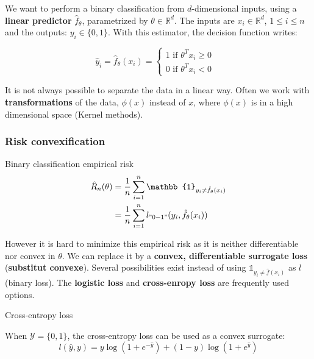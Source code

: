 \documentclass[
10pt, %
a4paper, %
oneside, %
headinclude,footinclude, %
BCOR5mm, %
]{scrartcl}
\begin{document}
We want to perform a binary classification from $d$-dimensional inputs, using a
\textbf{{linear predictor}} $\hat{f}_{\theta}$, parametrized by $\theta\in \mathbb{R}^d$. The inputs are $x_i \in \mathbb{R}^d$, $1\leq i \leq n$ and the outputs: $y_i\in \{0, 1\}$. With this estimator, the decision function writes:

$$
\hat{y}_i = \hat{f}_{\theta}(x_i)=\left\{
    \begin{array}{ll}
	1 \text{ if } \theta^Tx_i \geq 0 & \\
        0 \text{ if } \theta^Tx_i < 0& 
    \end{array}
\right.
$$

\begin{remark}
    It is not always possible to separate the data in a linear way. Often we work with \textbf{{transformations}} of the data, $\phi(x)$ instead of $x$, where $\phi(x)$ is in a high dimensional space (Kernel methods).
\end{remark}


\subsubsection{\large\color{Periwinkle}Risk convexification}

\begin{definition}{Binary classification empirical risk}
    \begin{equation}
	\begin{aligned}
	    \label{eq:}
	    \hat{R}_n(\theta) &= \frac{1}{n} \sum^{n}_{i=1} \mathbb{1}_{y_i\neq \hat{f}_{\theta}(x_i)}    \\
	    &=\frac{1}{n} \sum^{n}_{i=1} l_{"0-1"}(y_i,\hat{f}_{\theta}(x_i))  
	\end{aligned}
    \end{equation}
\end{definition}

However it is hard to minimize this empirical risk as it is neither differentiable nor convex in $\theta$. We can replace it by a \textbf{{convex, differentiable surrogate loss}} (\textbf{{substitut convexe}}). Several possibilities exist instead of using $ \mathbb{1}_{y_i\neq \hat{f}(x_i)}    $ as $l$ (binary loss). The \textbf{{logistic loss}} and \textbf{{cross-enropy loss}} are frequently used options.

\begin{definition}{Cross-entropy loss}

    When $ \mathcal{Y}  = \{0, 1\}$, the cross-entropy loss can be used as a convex surrogate:
    \label{loss:cross}
	\begin{equation}
	    l(\hat{y}, y) = y\log(1+e^{- \hat{y}})+ (1-y)\log(1+e^{ \hat{y}})
	\end{equation}
\end{definition}
\end{document}
